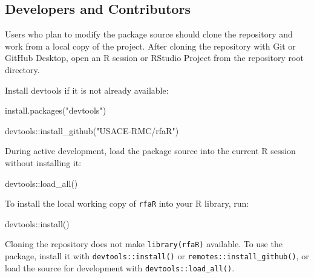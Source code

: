 \documentclass[
  letterpaper,
  DIV=11,
  numbers=noendperiod]{scrreprt}
\newenvironment{Shaded}{\begin{snugshade}}{\end{snugshade}}
\newcommand{\FunctionTok}[1]{\textcolor[rgb]{0.28,0.35,0.67}{#1}}
\newcommand{\NormalTok}[1]{\textcolor[rgb]{0.00,0.23,0.31}{#1}}
\newcommand{\SpecialCharTok}[1]{\textcolor[rgb]{0.37,0.37,0.37}{#1}}
\newcommand{\StringTok}[1]{\textcolor[rgb]{0.13,0.47,0.30}{#1}}
\begin{document}
\subsection{Developers and
Contributors}\label{developers-and-contributors}

Users who plan to modify the package source should clone the repository
and work from a local copy of the project. After cloning the repository
with Git or GitHub Desktop, open an R session or RStudio Project from
the repository root directory.

Install devtools if it is not already available:

\begin{Shaded}
\begin{Highlighting}[]
\FunctionTok{install.packages}\NormalTok{(}\StringTok{"devtools"}\NormalTok{)}

\NormalTok{devtools}\SpecialCharTok{::}\FunctionTok{install\_github}\NormalTok{(}\StringTok{"USACE{-}RMC/rfaR"}\NormalTok{)}
\end{Highlighting}
\end{Shaded}

During active development, load the package source into the current R
session without installing it:

\begin{Shaded}
\begin{Highlighting}[]
\NormalTok{devtools}\SpecialCharTok{::}\FunctionTok{load\_all}\NormalTok{()}
\end{Highlighting}
\end{Shaded}

To install the local working copy of \texttt{rfaR} into your R library,
run:

\begin{Shaded}
\begin{Highlighting}[]
\NormalTok{devtools}\SpecialCharTok{::}\FunctionTok{install}\NormalTok{()}
\end{Highlighting}
\end{Shaded}

\begin{tcolorbox}[enhanced jigsaw, arc=.35mm, bottomrule=.15mm, bottomtitle=1mm, breakable, colback=white, colbacktitle=quarto-callout-note-color!10!white, colframe=quarto-callout-note-color-frame, coltitle=black, left=2mm, leftrule=.75mm, opacityback=0, opacitybacktitle=0.6, rightrule=.15mm, title=\textcolor{quarto-callout-note-color}{\faInfo}\hspace{0.5em}{Note}, titlerule=0mm, toprule=.15mm, toptitle=1mm]

Cloning the repository does not make \texttt{library(rfaR)} available.
To use the package, install it with \texttt{devtools::install()} or
\texttt{remotes::install\_github()}, or load the source for development
with \texttt{devtools::load\_all()}.

\end{tcolorbox}
\end{document}
